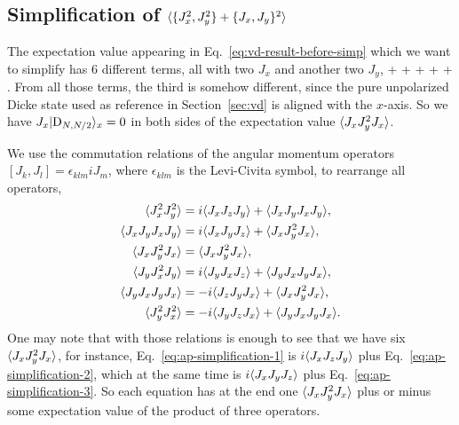 \subsection[Simplification of the Equation~\eqref{eq:vd-result-before-simp}]
{Simplification of $\langle{\{J_x^2,J_y^2\}+\{J_x,J_y\}^2}\rangle$}
\label{app:simplification-of-4th-moments}

The expectation value appearing in Eq.~\eqref{eq:vd-result-before-simp} which we want to simplify has 6 different terms, all with two $J_x$ and another two $J_y$,
\be
   +  + 
  +  +  + .
\ee
From all those terms, the third is somehow different, since the pure unpolarized Dicke state used as reference in Section~\ref{sec:vd} is aligned with the $x$-axis.
So we have $J_x\vert{\ensuremath{\textnormal{D}_{N,N/2}}}\rangle_x=0$ in both sides of the expectation value $\langle{J_xJ_y^2J_x}\rangle$.

We use the commutation relations of the angular momentum operators $[J_k,J_l]=\epsilon_{klm} iJ_m$, where $\epsilon_{klm}$ is the Levi-Civita symbol, to rearrange all operators,
\begin{subequations}
\begin{align}
  \langle{J_x^2J_y^2}\rangle & = i\langle{J_xJ_zJ_y}\rangle+\langle{J_xJ_yJ_xJ_y}\rangle,
  \label{eq:ap-simplification-1} \\
  \langle{J_xJ_yJ_xJ_y}\rangle & = i\langle{J_xJ_yJ_z}\rangle+\langle{J_xJ_y^2J_x}\rangle,
  \label{eq:ap-simplification-2} \\
  \langle{J_xJ_y^2J_x}\rangle & = \langle{J_xJ_y^2J_x}\rangle,
  \label{eq:ap-simplification-3} \\
  \langle{J_yJ_x^2J_y}\rangle & = i\langle{J_yJ_xJ_z}\rangle + \langle{J_yJ_xJ_yJ_x}\rangle,
  \label{eq:ap-simplification-4} \\
  \langle{J_yJ_xJ_yJ_x}\rangle & = -i\langle{J_zJ_yJ_x}\rangle + \langle{J_xJ_y^2J_x}\rangle,
  \label{eq:ap-simplification-5} \\
  \langle{J_y^2J_x^2}\rangle & = -i\langle{J_yJ_zJ_x}\rangle + \langle{J_yJ_xJ_yJ_x}\rangle.
  \label{eq:ap-simplification-6}
\end{align}
\end{subequations}
One may note that with those relations is enough to see that we have six $\langle{J_xJ_y^2J_x}\rangle$, for instance, Eq.~\eqref{eq:ap-simplification-1} is $i\langle{J_xJ_zJ_y}\rangle$ plus Eq.~\eqref{eq:ap-simplification-2}, which at the same time is $i\langle{J_xJ_yJ_z}\rangle$ plus Eq.~\eqref{eq:ap-simplification-3}.
So each equation has at the end one $\langle{J_xJ_y^2J_x}\rangle$ plus or minus some expectation value of the product of three operators.

